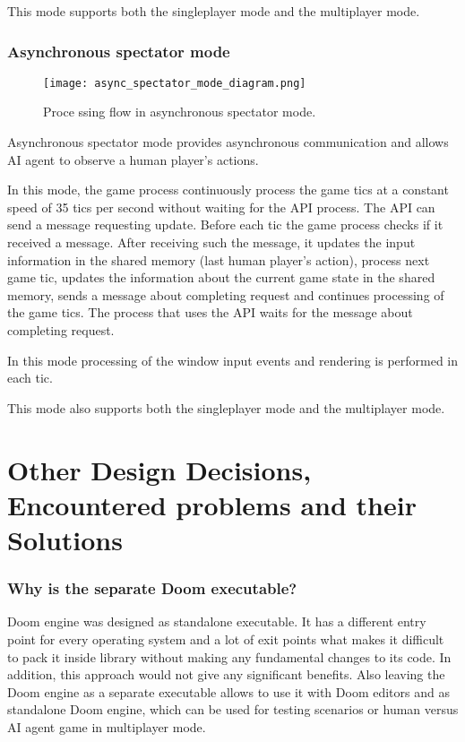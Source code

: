 	    This mode supports both the singleplayer mode and the multiplayer mode.

    \subsubsection{Asynchronous spectator mode}\label{sec:architecture_async_spectator_mode}

	    \begin{figure}
			    \centering
			    \texttt{[image: async\_spectator\_mode\_diagram.png]}
			    \caption{Proce      ssing flow in asynchronous spectator mode.}\label{fig:async_spectator_mode_diagram}
	    \end{figure}
	    
	    Asynchronous spectator mode provides asynchronous communication and allows AI agent to observe a human player's actions. 
	    
	    In this mode, the game process continuously process the game tics at a constant speed of 35 tics per second without waiting for the API process. The API can send a message requesting update. Before each tic the game process checks if it received a message. After receiving such the message, it updates the input information in the shared memory (last human player's action), process next game tic, updates the information about the current game state in the shared memory, sends a message about completing request and continues processing of the game tics. The process that uses the API waits for the message about completing request.

        In this mode processing of the window input events and rendering is performed in each tic.
        
        This mode also supports both the singleplayer mode and the multiplayer mode.

\section{Other Design Decisions, Encountered problems and their Solutions}\label{sec:architecture_solutions}

\subsubsection{Why is the separate Doom executable?}

Doom engine was designed as standalone executable. It has a different entry point for every operating system and a lot of exit points what makes it difficult to pack it inside library without making any fundamental changes to its code. In addition, this approach would not give any significant benefits. Also leaving the Doom engine as a separate executable allows to use it with Doom editors and as standalone Doom engine, which can be used for testing scenarios or human versus AI agent game in multiplayer mode.

